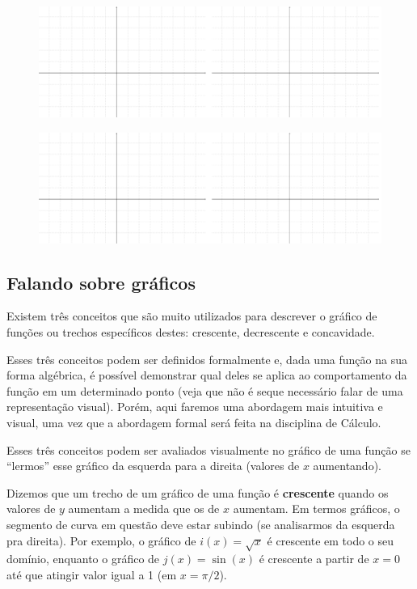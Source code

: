 \documentclass[main_estudante.tex]{subfiles}
\begin{document}
\begin{figure}[h]
\centering
\includegraphics[width=\textwidth]{./img/c7q1.png}
\end{figure}

\begin{figure}[h]
\centering
\includegraphics[width=\textwidth]{./img/c7q1.png}
\end{figure}

\newpage


\subsection*{Falando sobre gráficos}

Existem três conceitos que são muito utilizados para descrever o gráfico de funções ou trechos específicos destes: crescente, decrescente e concavidade.

Esses três conceitos podem ser definidos formalmente e, dada uma função na sua forma algébrica, é possível demonstrar qual deles se aplica ao comportamento da função em um determinado ponto (veja que não é seque necessário falar de uma representação visual). Porém, aqui faremos uma abordagem mais intuitiva e visual, uma vez que a abordagem formal será feita na disciplina de Cálculo.

Esses três conceitos podem ser avaliados visualmente no gráfico de uma função se ``lermos'' esse gráfico da esquerda para a direita (valores de $x$ aumentando).

Dizemos que um trecho de um gráfico de uma função é \textbf{crescente} quando os valores de $y$ aumentam a medida que os de $x$ aumentam. Em termos gráficos, o segmento de curva em questão deve estar subindo (se analisarmos da esquerda pra direita). Por exemplo, o gráfico de $i(x)=\sqrt{x}$ é crescente em todo o seu domínio, enquanto o gráfico de $j(x)=\sin(x)$ é crescente a partir de $x=0$ até que atingir valor igual a 1 (em $x=\pi/2$).
\end{document}
